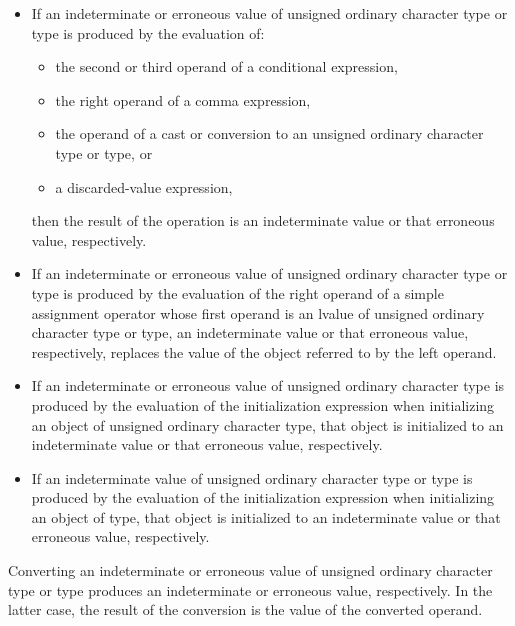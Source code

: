 \begin{itemize}
\item
  If an indeterminate or erroneous value of
  unsigned ordinary character type
  or  type
  is produced by the evaluation of:
  \begin{itemize}
  \item
    the second or third operand of a conditional expression,
  \item
    the right operand of a comma expression,
  \item
    the operand of a cast or conversion
    to an unsigned ordinary character type
    or  type, or
  \item
    a discarded-value expression,
  \end{itemize}
  then the result of the operation is an indeterminate value or
  that erroneous value, respectively.
\item
  If an indeterminate or erroneous value of
  unsigned ordinary character type or  type
  is produced by the evaluation of
  the right operand of a simple assignment operator
  whose first operand is an lvalue of
  unsigned ordinary character type or  type,
  an indeterminate value or that erroneous value, respectively, replaces
  the value of the object referred to by the left operand.
\item
  If an indeterminate or erroneous value of unsigned ordinary character type
  is produced by the evaluation of the initialization expression
  when initializing an object of unsigned ordinary character type,
  that object is initialized to an indeterminate
  value or that erroneous value, respectively.
\item
  If an indeterminate value of
  unsigned ordinary character type or  type
  is produced by the evaluation of the initialization expression
  when initializing an object of  type,
  that object is initialized to an indeterminate value or
  that erroneous value, respectively.
\end{itemize}
Converting an indeterminate or erroneous value of
unsigned ordinary character type or  type
produces an indeterminate or erroneous value, respectively.
In the latter case,
the result of the conversion is the value of the converted operand.
